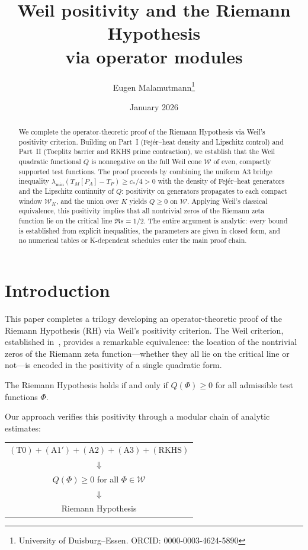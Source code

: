 \documentclass[11pt,a4paper]{article}
\title{Weil positivity and the Riemann Hypothesis\\ via operator modules}
\author{Eugen Malamutmann\thanks{University of Duisburg--Essen. ORCID: 0000-0003-4624-5890}}
\date{January 2026}
\theoremstyle{definition}
\newcommand{\WW}{\mathcal{W}}
\begin{document}
\maketitle

\begin{abstract}
We complete the operator-theoretic proof of the Riemann Hypothesis via Weil's positivity criterion. Building on Part~I (Fej\'er--heat density and Lipschitz control) and Part~II (Toeplitz barrier and RKHS prime contraction), we establish that the Weil quadratic functional $Q$ is nonnegative on the full Weil cone $\WW$ of even, compactly supported test functions. The proof proceeds by combining the uniform A3 bridge inequality $\lambda_{\min}(T_M[P_A] - T_P) \ge c_*/4 > 0$ with the density of Fej\'er--heat generators and the Lipschitz continuity of $Q$: positivity on generators propagates to each compact window $\WW_K$, and the union over $K$ yields $Q \ge 0$ on $\WW$. Applying Weil's classical equivalence, this positivity implies that all nontrivial zeros of the Riemann zeta function lie on the critical line $\Re s = 1/2$. The entire argument is analytic: every bound is established from explicit inequalities, the parameters are given in closed form, and no numerical tables or K-dependent schedules enter the main proof chain.
\end{abstract}

\section{Introduction}\label{sec:intro}

This paper completes a trilogy developing an operator-theoretic proof of the Riemann Hypothesis (RH) via Weil's positivity criterion. The Weil criterion, established in~\cite{Weil1952,Weil1972}, provides a remarkable equivalence: the location of the nontrivial zeros of the Riemann zeta function---whether they all lie on the critical line or not---is encoded in the positivity of a single quadratic form.

\begin{theorem*}
The Riemann Hypothesis holds if and only if $Q(\Phi) \ge 0$ for all admissible test functions $\Phi$.
\end{theorem*}

Our approach verifies this positivity through a modular chain of analytic estimates:
\begin{center}
\begin{tabular}{c}
$\mathrm{(T0)} + \mathrm{(A1')} + \mathrm{(A2)} + \mathrm{(A3)} + \mathrm{(RKHS)}$ \\
$\Downarrow$ \\
$Q(\Phi) \ge 0$ for all $\Phi \in \WW$ \\
$\Downarrow$ \\
Riemann Hypothesis
\end{tabular}
\end{center}
\end{document}
